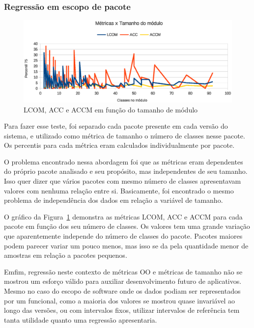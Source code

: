 \subsubsection{Regressão em escopo de pacote}

\begin{figure}[!htb]
\centering
\includegraphics [keepaspectratio=true,scale=0.7]{figuras/metricasxtamanhomodulo.eps}
\caption{LCOM, ACC e ACCM em função do tamanho de módulo}
\label{fig:metricasxtamanhomodulo}
\end{figure}

Para fazer esse teste, foi separado cada pacote presente em cada versão do sistema, e utilizado como métrica de tamanho o número de classes nesse pacote. Os percentis para cada métrica eram calculados individualmente por pacote.

O problema encontrado nessa abordagem foi que as métricas eram dependentes do próprio pacote analisado e seu propósito, mas independentes de seu tamanho. Isso quer dizer que vários pacotes com mesmo número de classes apresentavam valores com nenhuma relação entre si. Basicamente, foi encontrado o mesmo problema de independência dos dados em relação a variável de tamanho. 

O gráfico da Figura~\ref{fig:metricasxtamanhomodulo} demonstra as métricas LCOM, ACC e ACCM para cada pacote em função dos seu número de classes. Os valores tem uma grande variação que aparentemente independe do número de classes do pacote. Pacotes maiores podem parecer variar um pouco menos, mas isso se da pela quantidade menor de amostras em relação a pacotes pequenos.

Emfim, regressão neste contexto de métricas OO e métricas de tamanho não se mostrou um esforço válido para auxiliar desenvolvimento futuro de aplicativos. Mesmo no caso do escopo de software onde os dados podiam ser representados por um funcional, como a maioria dos valores se mostrou quase invariável ao longo das versões, ou com intervalos fixos, utilizar intervalos de referência tem tanta utilidade quanto uma regressão apresentaria. 

